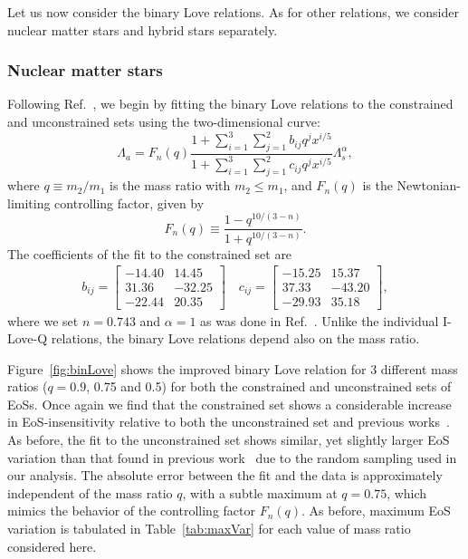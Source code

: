 \documentclass[prd,twocolumn,nofootinbib,superscriptaddress,amsmath,amssymb]{revtex4-1}
\begin{document}
Let us now consider the binary Love relations. As for other relations, we consider nuclear matter stars and hybrid stars separately.

\subsubsection{Nuclear matter stars}

Following Ref.~\cite{Yagi:binLove}, we begin by fitting the binary Love relations to the constrained and unconstrained sets using the two-dimensional curve:
\begin{equation}\label{eq:binLovefit}
\Lambda_a=F_n(q) \frac{1+ \sum_{i=1}^3 \sum_{j=1}^2 b_{ij}q^j x^{i/5}}{1 + \sum_{i=1}^3 \sum_{j=1}^2 c_{ij}q^j x^{i/5}} \Lambda_s^{\alpha},
\end{equation}
where $q\equiv m_{2}/m_{1}$ is the mass ratio with $m_2 \leq m_1$, and $F_n(q)$ is the Newtonian-limiting controlling factor, given by
\begin{equation}\label{eq:control}
F_n(q) \equiv \frac{1-q^{10/(3-n)}}{1+q^{10/(3-n)}}.
\end{equation}
The coefficients of the fit to the constrained set are 
\begin{align}
b_{ij} = \begin{bmatrix}
    -14.40 & 14.45   \\
    31.36 & -32.25   \\
    -22.44 & 20.35   
\end{bmatrix}
\quad
c_{ij} = \begin{bmatrix}
    -15.25 & 15.37   \\
    37.33 & -43.20   \\
    -29.93 & 35.18   
\end{bmatrix},
\end{align}
where we set $n = 0.743$ and $\alpha = 1$ as was done in Ref.~\cite{Yagi:binLove}.
Unlike the individual I-Love-Q relations, the binary Love relations depend also on the mass ratio. 

Figure~\ref{fig:binLove} shows the improved binary Love relation for 3 different mass ratios ($q=0.9$, 0.75 and 0.5) for both the constrained and unconstrained sets of EoSs. Once again we find that the constrained set shows a considerable increase in EoS-insensitivity relative to both the unconstrained set and previous works~\cite{Yagi:binLove}. As before, the fit to the unconstrained set shows similar, yet slightly larger EoS variation than that found in previous work~\cite{Yagi:binLove} due to the random sampling used in our analysis. The absolute error between the fit and the data is approximately independent of the mass ratio $q$, with a subtle maximum at $q=0.75$, which mimics the behavior of the controlling factor $F_n(q)$. As before, maximum EoS variation is tabulated in Table~\ref{tab:maxVar} for each value of mass ratio considered here.
\end{document}
